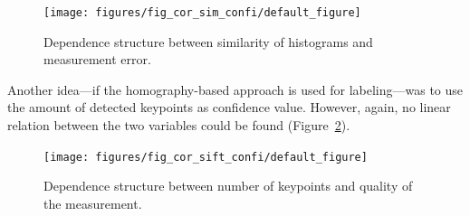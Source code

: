 \begin{figure}[h!]
\begin{center}
\texttt{[image: figures/fig\_cor\_sim\_confi/default\_figure]}
\caption{{\label{fig:cor_sim_confi} Dependence structure between similarity of histograms and
    measurement error.%
}}
\end{center}
\end{figure}

Another idea---if the homography-based approach is used for
labeling---was to use the amount of detected keypoints as confidence
value. However, again, no linear relation between the two variables
could be found (Figure~\ref{fig:cor_sift_confi}).

\begin{figure}[h!]
\begin{center}
\texttt{[image: figures/fig\_cor\_sift\_confi/default\_figure]}
\caption{{\label{fig:cor_sift_confi} Dependence structure between number of keypoints and quality
    of the measurement.%
}}
\end{center}
\end{figure}

